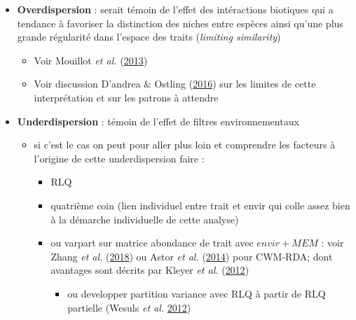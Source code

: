 \documentclass[]{article}
\providecommand{\tightlist}{%
  \setlength{\itemsep}{0pt}\setlength{\parskip}{0pt}}
\begin{document}
\begin{itemize}
\tightlist
\item
  \textbf{Overdispersion} : serait témoin de l'effet des intéractions
  biotiques qui a tendance à favoriser la distinction des niches entre
  espèces ainsi qu'une plus grande régularité dans l'espace des traits
  (\emph{limiting similarity})

  \begin{itemize}
  \tightlist
  \item
    Voir Mouillot \emph{et al.}
    (\protect\hyperlink{ref-mouillot2013indic}{2013})
  \item
    Voir discussion D'andrea \& Ostling
    (\protect\hyperlink{ref-dandrea_ostling2016}{2016}) sur les limites
    de cette interprétation et sur les patrons à attendre
  \end{itemize}
\item
  \textbf{Underdispersion} : témoin de l'effet de filtres
  environnementaux

  \begin{itemize}
  \tightlist
  \item
    si c'est le cas on peut pour aller plus loin et comprendre les
    facteurs à l'origine de cette underdispersion faire :

    \begin{itemize}
    \tightlist
    \item
      RLQ
    \item
      quatrième coin (lien individuel entre trait et envir qui colle
      assez bien à la démarche individuelle de cette analyse)
    \item
      ou varpart sur matrice abondance de trait avec \(envir + MEM\) :
      voir Zhang \emph{et al.} (\protect\hyperlink{ref-zhang2018}{2018})
      ou Astor \emph{et al.}
      (\protect\hyperlink{ref-astor2014trait_dispersion}{2014}) pour
      CWM-RDA; dont avantages sont décrits par Kleyer \emph{et al.}
      (\protect\hyperlink{ref-kleyer2012methods}{2012})

      \begin{itemize}
      \tightlist
      \item
        ou developper partition variance avec RLQ à partir de RLQ
        partielle (Wesuls \emph{et al.}
        \protect\hyperlink{ref-wesuls2012partialRLQ}{2012})
      \end{itemize}
    \end{itemize}
  \end{itemize}
\end{itemize}
\end{document}
